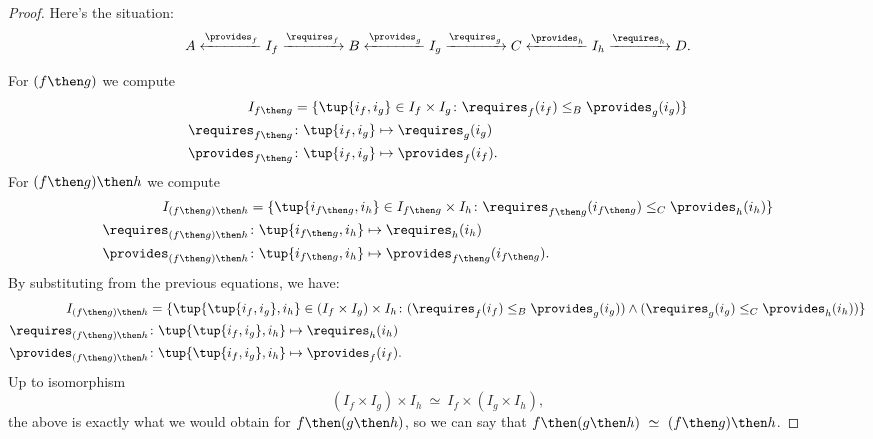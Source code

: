 \begin{proof}
Here's the situation:
\begin{equation}
    A \xleftarrow{\provides_f} I_f \xrightarrow{\requires_f} B
      \xleftarrow{\provides_g} I_g \xrightarrow{\requires_g} C
      \xleftarrow{\provides_h} I_h \xrightarrow{\requires_h} D.
\end{equation}

For $(f\then g)$ we compute
\begin{equation}
\begin{aligned}
I_{f\then g} &= \{
                \tup{i_f,i_g} \in I_f \times I_g \colon
                \requires_f(i_f) \leq_{B} \provides_g(i_g)
            \}\\
        \requires_{f\then g}  &\colon  \tup{i_f,i_g} \mapsto \requires_g(i_g) \\
        \provides_{f\then g}  &\colon  \tup{i_f,i_g} \mapsto \provides_f(i_f).
\end{aligned}
\end{equation}
For $(f\then g)\then h$ we compute
\begin{equation}
\begin{aligned}
        I_{(f\then g)\then h} &= \{
                \tup{i_{f\then g},i_h} \in I_{f\then g} \times I_{h}\colon
                \requires_{f\then g}(i_{f\then g}) \leq_{C} \provides_h(i_h)
            \}\\
        \requires_{(f\then g)\then h}  &\colon  \tup{i_{f\then g},i_h} \mapsto \requires_h(i_h) \\
        \provides_{(f\then g)\then h}  &\colon  \tup{i_{f\then g},i_h} \mapsto \provides_{f\then g}(i_{f\then g}).
\end{aligned}
\end{equation}
By substituting from the previous equations, we have:
\begin{equation}
\begin{aligned}
        I_{(f\then g)\then h} &= \{
                \tup{\tup{i_f, i_g},i_h} \in (I_f \times I_g) \times I_{h}\colon
                (\requires_f(i_f) \leq_{B} \provides_g(i_g))
                \wedge
                (\requires_g(i_g) \leq_{C} \provides_h(i_h))
            \}\\
        \requires_{(f\then g)\then h}  &\colon  \tup{\tup{i_f, i_g},i_h} \mapsto \requires_h(i_h) \\
        \provides_{(f\then g)\then h}  &\colon  \tup{\tup{i_f, i_g},i_h} \mapsto \provides_f(i_f).
\end{aligned}
\end{equation}
Up to isomorphism
\begin{equation}
    (I_f \times I_g) \times I_{h} \ \simeq\  I_f \times (I_g \times I_{h}),
\end{equation}
the above is exactly what we would obtain for $f\then (g\then h)$, so we can say
that  $f\then(g\then h)\ \simeq\ (f\then g)\then h$.
\end{proof}


